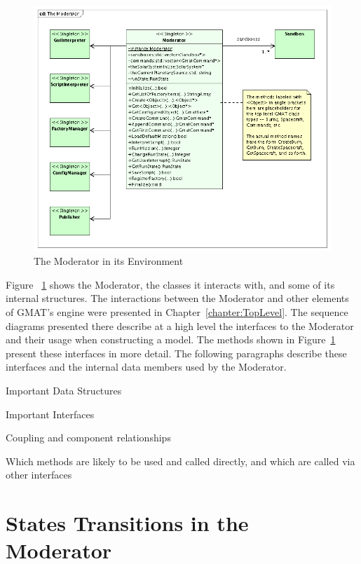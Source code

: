\begin{figure}[htb]
\begin{center}
\includegraphics[370,346]{Images/TheModerator.png}
\caption{The Moderator in its Environment}
\label{figure:ModeratorClassDiagram}
\end{center}
\end{figure}

Figure ~\ref{figure:ModeratorClassDiagram} shows the Moderator, the classes it interacts with, and
some of its internal structures.  The interactions between the Moderator and other elements of
GMAT's engine were presented in Chapter~\ref{chapter:TopLevel}.  The sequence diagrams presented
there describe at a high level the interfaces to the Moderator and their usage when constructing a
model.  The methods shown in Figure~\ref{figure:ModeratorClassDiagram} present these interfaces in
more detail.  The following paragraphs describe these interfaces and the internal data members used
by the Moderator.




Important Data Structures

Important Interfaces

Coupling and component relationships

Which methods are likely to be used and called directly, and which are called via other interfaces


\section{\label{section:ModeratorStates}States Transitions in the Moderator}


